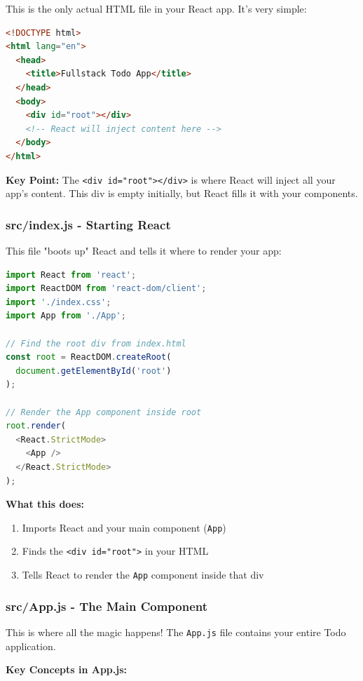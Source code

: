 \documentclass[12pt,a4paper]{article}
\begin{document}
This is the only actual HTML file in your React app. It's very simple:

\begin{lstlisting}[language=HTML, caption=public/index.html (simplified)]
<!DOCTYPE html>
<html lang="en">
  <head>
    <title>Fullstack Todo App</title>
  </head>
  <body>
    <div id="root"></div>
    <!-- React will inject content here -->
  </body>
</html>
\end{lstlisting}

\textbf{Key Point:} The \texttt{<div id="root"></div>} is where React will inject all your app's content. This div is empty initially, but React fills it with your components.

\subsubsection{src/index.js - Starting React}

This file "boots up" React and tells it where to render your app:

\begin{lstlisting}[language=JavaScript, caption=src/index.js]
import React from 'react';
import ReactDOM from 'react-dom/client';
import './index.css';
import App from './App';

// Find the root div from index.html
const root = ReactDOM.createRoot(
  document.getElementById('root')
);

// Render the App component inside root
root.render(
  <React.StrictMode>
    <App />
  </React.StrictMode>
);
\end{lstlisting}

\textbf{What this does:}
\begin{enumerate}
    \item Imports React and your main component (\texttt{App})
    \item Finds the \texttt{<div id="root">} in your HTML
    \item Tells React to render the \texttt{App} component inside that div
\end{enumerate}

\subsubsection{src/App.js - The Main Component}

This is where all the magic happens! The \texttt{App.js} file contains your entire Todo application.

\textbf{Key Concepts in App.js:}
\end{document}

